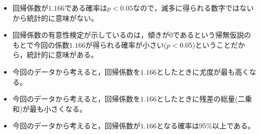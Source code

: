 \begin{itemize}
	\item 回帰係数が$1.166$である確率は$p<0.05$なので，滅多に得られる数字ではないから統計的に意味がない。
	\item 回帰係数の有意性検定が示しているのは，傾きが0であるという帰無仮説のもとで今回の係数$1.166$が得られる確率が小さい($p<0.05$)ということだから，統計的に意味がある。
	\item 今回のデータから考えると，回帰係数を$1.166$としたときに尤度が最も高くなる。
	\item 今回のデータから考えると，回帰係数を$1.166$としたときに残差の総量(二乗和)が最も小さくなる。
	\item 今回のデータから考えると，回帰係数が$1.166$となる確率は95\%以上である。
\end{itemize}
